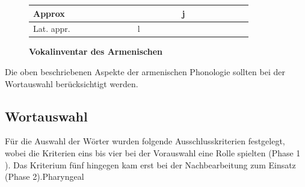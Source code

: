 \documentclass[11pt,a4paper,headsepline,twoside,toc=bibliography]{scrreprt}
\begin{document}
\begin{figure}
\begin{adjustbox}{width=1\textwidth}
\begin{tabular}{|l|ccc|cc|ccc|ccc|cc|ccc|cc|cc|}
			\hline Approx & 							%
			& &	&													%
			& &											%
			& & &								%
			&  & &											
			& j &													%
			& &	&								%
			& &														%
			& 													%
			\\		
			
			\hline Lat. appr. & 					%
			& &	&	%
			& &		%
			&&l&								%
			& &	&										
			& &												%
			& & &											%
			& &														%
			& 	\\%
			\hline
		\end{tabular}
	\end{adjustbox}
\end{figure}


\begin{figure}
	\caption{\textbf{Vokalinventar des Armenischen}}\label{chart:vowel_chart}	

	\begin{center}
		{\Large
		\begin{vowel}				
		\end{vowel}
		}
	\end{center}

\end{figure}


Die oben beschriebenen Aspekte der armenischen Phonologie sollten bei der Wortauswahl berücksichtigt werden.

\subsection{Wortauswahl}
\label{sec:pseudowords}

Für die Auswahl der Wörter wurden folgende Ausschlusskriterien festgelegt, wobei die Kriterien eins bis vier bei der Vorauswahl eine Rolle spielten (Phase 1 ). Das Kriterium fünf hingegen kam erst bei der Nachbearbeitung zum
Einsatz (Phase 2).Pharyngeal
\end{document}
